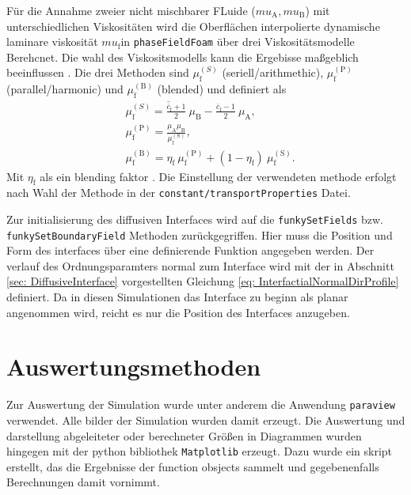 Für die Annahme zweier nicht mischbarer FLuide ($mu_{\mathrm{A}}, mu_{\mathrm{B}}$) mit unterschiedlichen Viskositäten wird die Oberflächen interpolierte dynamische laminare viskosität $mu_{\mathrm{f}}$in \texttt{phaseFieldFoam} über drei Viskositätsmodelle Berehcnet. Die wahl des Viskositsmodells kann die Ergebisse maßgeblich beeinflussen . Die drei Methoden sind $\mu_{\mathrm{f}}^{(S)}$ (seriell/arithmethic), $\mu_{\mathrm{f}}^{(\mathrm{P})}$ (parallel/harmonic) und $\mu_{\mathrm{f}}^{(\mathrm{B})}$ (blended) und definiert als
$$
\begin{aligned}
&\mu_{\mathrm{f}}^{(S)} =\frac{\hat{\overline{c}}_{\mathrm{f}}+1}{2}\:\mu_{\mathrm{B}}-\frac{\hat{\overline{c}}_{\mathrm{f}}-1}{2}\:\mu_{\mathrm{A}},  \\
&\mu_{\mathrm{f}}^{(\mathrm{P})} =\frac{\mu_{\mathrm{A}}\mu_{\mathrm{B}}}{\mu_{\mathrm{f}}^{(\mathrm{S})}},  \\
&\mu_{\mathrm{f}}^{(\mathrm{B})} =\eta_{\mathrm{f}}\:\mu_{\mathrm{f}}^{\mathrm{(P)}}+(1-\eta_{\mathrm{f}})\:\mu_{\mathrm{f}}^{\mathrm{(S)}}.
\end{aligned}
$$
Mit $\eta_{\mathrm{f}}$ als ein blending faktor \cite{holzinger2021DirectNumericalSimulation}. Die Einstellung der verwendeten methode erfolgt nach Wahl der Methode in der \texttt{constant/transportProperties} Datei.

Zur initialisierung des diffusiven Interfaces wird auf die \texttt{funkySetFields} bzw. \texttt{funkySetBoundaryField} Methoden zurückgegriffen. Hier muss die Position und Form des interfaces über eine definierende Funktion angegeben werden. Der verlauf des Ordnungsparamters normal zum Interface wird mit der in Abschnitt \ref{sec: DiffusiveInterface} vorgestellten Gleichung \ref{eq: InterfactialNormalDirProfile} definiert. Da in diesen Simulationen das Interface zu beginn als planar angenommen wird, reicht es nur die Position des Interfaces anzugeben.


\section{Auswertungsmethoden}
Zur Auswertung der Simulation wurde unter anderem die Anwendung \texttt{paraview} verwendet. Alle bilder der Simulation wurden damit erzeugt. Die Auswertung und darstellung abgeleiteter oder berechneter Größen in Diagrammen wurden hingegen mit der python bibliothek \texttt{Matplotlib} erzeugt. Dazu wurde ein skript erstellt, das die Ergebnisse der function obsjects sammelt und gegebenenfalls Berechnungen damit vornimmt. 

